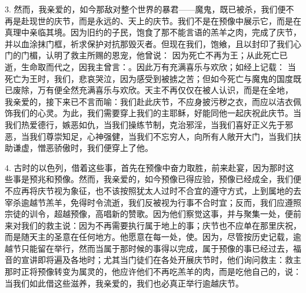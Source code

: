 3. 然而，我亲爱的，如今那敌对整个世界的暴君——魔鬼，既已被杀，我们便不再是赴现世的庆节，而是永远的、天上的庆节。我们不是在预像中展示它，而是在真理中亲临其境。因为旧约的子民，饱食了那不能言语的羔羊之肉，完成了庆节，并以血涂抹门框，祈求保护对抗那毁灭者。但现在我们，饱飨，且以封印了我们心门的门楣，认明了救主所赐的恩宠，他曾说： 因为死亡不再为王；从此死亡已逝，生命取而代之，因我主曾言：。因此万有充满喜乐与欢欣；如经上记载： 当死亡为王时，我们，悲哀哭泣，因为感受到被掳之苦；但如今死亡与魔鬼的国度既已废除，万有便全然充满喜乐与欢欣。天主不再仅仅在被人认识，而是在全地， 我亲爱的，接下来已不言而喻：我们赴此庆节，不应身披污秽之衣，而应以洁衣佩饰我们的心灵。为此，我们需要穿上我们的主耶稣，好能同他一起庆祝此庆节。当我们热爱德行，嫉恶如仇，当我们操练节制，克治邪淫，当我们喜好正义先于邪恶，当我们尊崇知足，心神强健，当我们不忘穷人，向所有人敞开大门，当我们扶助谦虚，憎恶骄傲时，我们便穿上了他。\par

4. 古时的以色列，借着这些事，首先在预像中奋力取胜，前来赴宴，因为那时这些事是预兆和预像。然而，我亲爱的，如今预像已得应验，预像已经成全，我们便不应再将庆节视为象征，也不该按照犹太人过时不合宜的遵守方式，上到属地的去宰杀逾越节羔羊，免得时令流逝，我们反被视为行事不合时宜；反而，我们应遵照宗徒的训令，超越预像，高唱新的赞歌。因为他们察觉这事，并与聚集一处，便前来对我们的救主说：因为不再需要执行属于地上的事；庆节也不应单在那里庆祝，而是随天主的圣意在任何地方。他愿意在每一处，使。因为，尽管按历史记载，逾越节只能留在举行，然而当属于那时候的事得以完成，属于预像的事已经过去，福音的宣讲即将遍及各地时；尤其当门徒们在各处开展庆节时，他们询问救主：救主那时正将预像转变为属灵的，他应许他们不再吃羔羊的肉，而是吃他自己的，说：当我们如此借这些滋养，我亲爱的，我们也必真正举行逾越庆节。\par

